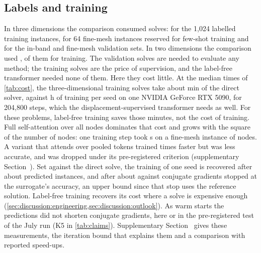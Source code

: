 \subsection{Labels and training}\label{sec:cost:labels}

In three dimensions the comparison consumed \numThreeSolves{} solves: \numThreeTrainSolves{}
for the 1,024 labelled training instances, \numThreeFewSolves{} for 64 fine-mesh instances
reserved for few-shot training and \numThreeEvalSolves{} for the in-band and fine-mesh validation sets. In two dimensions the comparison used
\numCmSolves{}, \numCmSolvesTrain{} of them for
training. The validation solves are needed to evaluate any method; the training solves are
the price of supervision, and the label-free transformer needed none of them. Here they cost
little. At the median times of \cref{tab:cost}, the \numThreeTrainSolves{} three-dimensional
training solves take about \numCostLabelMin{} min of the direct solver, against
\numTimeThreeSeed{} h of training per seed on one NVIDIA GeForce RTX 5090, for 204,800
steps, which the displacement-supervised transformer needs as well. For these problems,
label-free training saves those minutes, not the cost of training. Full self-attention over
all nodes dominates that cost and grows with the square of the number of nodes: one training
step took \numEtwoTransformerFineStep{} s on a fine-mesh instance of \numEtwoNodesFine{}
nodes. A variant that attends over pooled tokens trained \numTimeBottleneckSpeedup{} times
faster but was less accurate, and was dropped under its pre-registered criterion
(supplementary Section~\SuppSide{}). Set against the direct solve, the training of one seed
is recovered after about \numCostBreakEvenDirect{} predicted instances, and after about
\numCostBreakEvenMatch{} against conjugate gradients stopped at the surrogate's accuracy, an
upper bound since that stop uses the reference solution. Label-free training recovers its
cost where a solve is expensive enough
(\cref{sec:discussion:engineering,sec:discussion:outlook}). As warm starts the
predictions did not shorten conjugate gradients, here or in the pre-registered test of the
July run (K5 in \cref{tab:claims}). Supplementary Section~\SuppWarm{} gives these measurements, the iteration bound that explains them and a comparison with reported
speed-ups.
